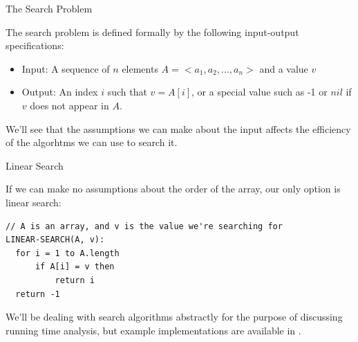 \documentclass{beamer}
\begin{document}
\begin{frame}[fragile]{The Search Problem}

The search problem is defined formally by the following input-output specifications:
\begin{itemize}
\item Input: A sequence of $n$ elements $A = <a_1, a_2, ..., a_n>$ and a value $v$
\item Output: An index $i$ such that $v = A[i]$, or a special value such as -1 or $nil$ if $v$ does not appear in $A$.
\end{itemize}

We'll see that the assumptions we can make about the input affects the efficiency of the algorhtms we can use to search it.

\end{frame}


\begin{frame}[fragile]{Linear Search}

If we can make no assumptions about the order of the array, our only option is linear search:
\begin{lstlisting}
// A is an array, and v is the value we're searching for
LINEAR-SEARCH(A, v):
  for i = 1 to A.length
      if A[i] = v then
          return i
  return -1
\end{lstlisting}

We'll be dealing with search algorithms abstractly for the purpose of discussing running time analysis, but example implementations are available in .

\end{frame}





\end{document}
